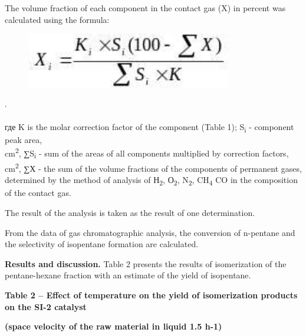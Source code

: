 The volume fraction of each component in the contact gas (X) in percent
was calculated using the formula:

\begin{figure}[H]
	\centering
	\includegraphics[width=0.8\textwidth]{assets/1055}
	\caption*{}
\end{figure}\textsuperscript{,}

где K is the molar correction factor of the component (Table 1);
S\textsubscript{i} - component peak area,\\
cm\textsuperscript{2}, ∑S\textsubscript{i} - sum of the areas of all
components multiplied by correction factors, cm\textsuperscript{2}, ∑Х -
the sum of the volume fractions of the components of permanent gases,
determined by the method of analysis of Н\textsubscript{2},
О\textsubscript{2}, N\textsubscript{2}, CH\textsubscript{4} CO in the
composition of the contact gas.

The result of the analysis is taken as the result of one determination.

From the data of gas chromatographic analysis, the conversion of
n-pentane and the selectivity of isopentane formation are calculated.

{\bfseries Results and discussion.} Table 2 presents the results of
isomerization of the pentane-hexane fraction with an estimate of the
yield of isopentane.

{\bfseries Table 2 -- Effect of temperature on the yield of isomerization
products on the SI-2 catalyst}

{\bfseries (space velocity of the raw material in liquid 1.5 h-1)}

